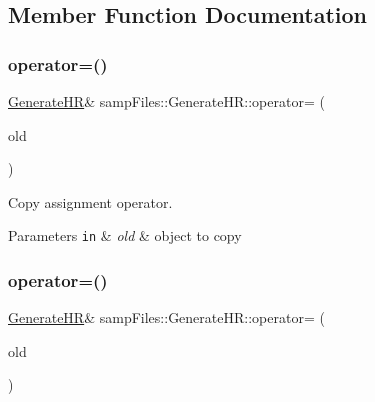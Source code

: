 \subsection{Member Function Documentation}
\mbox{\label{classsamp_files_1_1_generate_h_r_a53cdc064c4d6ba7f1189948376f8b071}} 
\subsubsection{\texorpdfstring{operator=()}{operator=()}\hspace{0.1cm}{\footnotesize\ttfamily [1/2]}}
{\footnotesize\ttfamily \hyperlink{classsamp_files_1_1_generate_h_r}{Generate\+HR}\& samp\+Files\+::\+Generate\+H\+R\+::operator= (\begin{DoxyParamCaption}\item[{const \hyperlink{classsamp_files_1_1_generate_h_r}{Generate\+HR} \&}]{old }\end{DoxyParamCaption})\hspace{0.3cm}{\ttfamily [default]}}



Copy assignment operator. 


\begin{DoxyParams}[1]{Parameters}
\mbox{\tt in}  & {\em old} & object to copy \\
\hline
\end{DoxyParams}
\mbox{\label{classsamp_files_1_1_generate_h_r_aa415dd128cd0de2e567e86cb375bc919}} 
\subsubsection{\texorpdfstring{operator=()}{operator=()}\hspace{0.1cm}{\footnotesize\ttfamily [2/2]}}
{\footnotesize\ttfamily \hyperlink{classsamp_files_1_1_generate_h_r}{Generate\+HR}\& samp\+Files\+::\+Generate\+H\+R\+::operator= (\begin{DoxyParamCaption}\item[{\hyperlink{classsamp_files_1_1_generate_h_r}{Generate\+HR} \&\&}]{old }\end{DoxyParamCaption})\hspace{0.3cm}{\ttfamily [default]}}



